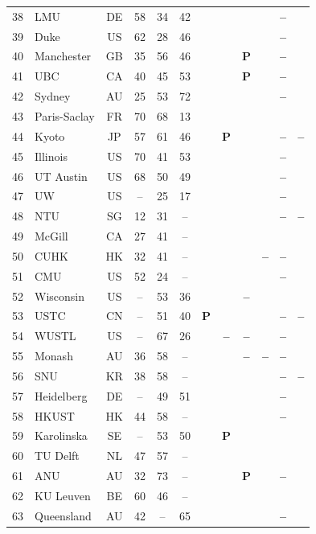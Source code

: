 \documentclass[pdflatex,sn-basic,Numbered,iicol]{sn-jnl}
\newcommand{\si}{\ding{51}}
\newcommand{\no}{\textcolor{gris}{\textbf{--}}}
\newcommand{\pc}{\textbf{P}}
\theoremstyle{thmstyleone}
\theoremstyle{thmstyletwo}
\theoremstyle{thmstylethree}
\begin{document}
\begin{appendices}
\begin{longtable}{@{}r l c c c c c c c c c c@{}}
			38 & LMU & DE & 58 & 34 & 42 & \si & \si & \si & \si & \no & \si \\
			39 & Duke & US & 62 & 28 & 46 & \si & \si & \si & \si & \no & \si \\
			40 & Manchester & GB & 35 & 56 & 46 & \si & \si & \pc & \si & \no & \si \\
			41 & UBC & CA & 40 & 45 & 53 & \si & \si & \pc & \si & \no & \si \\
			42 & Sydney & AU & 25 & 53 & 72 & \si & \si & \si & \si & \no & \si \\
			43 & Paris-Saclay & FR & 70 & 68 & 13 & \si & \si & \si & \si & \si & \si \\
			44 & Kyoto & JP & 57 & 61 & 46 & \si & \pc & \si & \si & \no & \no \\
			45 & Illinois & US & 70 & 41 & 53 & \si & \si & \si & \si & \no & \si \\
			46 & UT Austin & US & 68 & 50 & 49 & \si & \si & \si & \si & \no & \si \\
			47 & UW & US & -- & 25 & 17 & \si & \si & \si & \si & \no & \si \\
			48 & NTU & SG & 12 & 31 & -- & \si & \si & \si & \si & \no & \no \\
			49 & McGill & CA & 27 & 41 & -- & \si & \si & \si & \si & \si & \si \\
			50 & CUHK & HK & 32 & 41 & -- & \si & \si & \si & \no & \no & \si \\
			51 & CMU & US & 52 & 24 & -- & \si & \si & \si & \si & \no & \si \\
			52 & Wisconsin & US & -- & 53 & 36 & \si & \si & \no & \si & \si & \si \\
			53 & USTC & CN & -- & 51 & 40 & \pc & \si & \si & \si & \no & \no \\
			54 & WUSTL & US & -- & 67 & 26 & \si & \no & \no & \si & \no & \si \\
			55 & Monash & AU & 36 & 58 & -- & \si & \si & \no & \no & \no & \si \\
			56 & SNU & KR & 38 & 58 & -- & \si & \si & \si & \si & \no & \no \\
			57 & Heidelberg & DE & -- & 49 & 51 & \si & \si & \si & \si & \no & \si \\
			58 & HKUST & HK & 44 & 58 & -- & \si & \si & \si & \si & \no & \si \\
			59 & Karolinska & SE & -- & 53 & 50 & \si & \pc & \si & \si & \si & \si \\
			60 & TU Delft & NL & 47 & 57 & -- & \si & \si & \si & \si & \si & \si \\
			61 & ANU & AU & 32 & 73 & -- & \si & \si & \pc & \si & \no & \si \\
			62 & KU Leuven & BE & 60 & 46 & -- & \si & \si & \si & \si & \si & \si \\
			63 & Queensland & AU & 42 & -- & 65 & \si & \si & \si & \si & \no & \si \\
		\end{longtable}
		\normalsize
		

\end{appendices}
\end{document}
